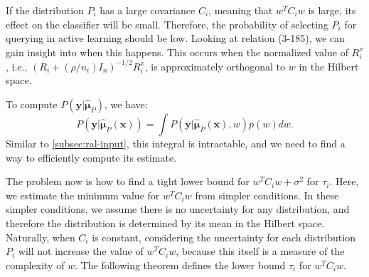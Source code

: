 	If the distribution $P_i$ has a large covariance $C_i$, meaning that $w^T C_i w$ is large, its effect on the classifier will be small. Therefore, the probability of selecting $P_i$ for querying in active learning should be low. Looking at relation (3-185), we can gain insight into when this happens. This occurs when the normalized value of $R_i^x$, i.e., $(R_i + (\rho/n_i) I_n)^{-1/2} R_i^x$, is approximately orthogonal to $w$ in the Hilbert space.
	
	To compute $P(\mathbf{y}|\hat{\boldsymbol{\mu}}_P)$, we have:
	\begin{equation}
		P(\mathbf{y}|\hat{\boldsymbol{\mu}}_P(\mathbf{x})) = \int P(\mathbf{y}|\hat{\boldsymbol{\mu}}_P(\mathbf{x}), w) p(w) dw.
	\end{equation}
	Similar to \ref{subsec:ral-input}, this integral is intractable, and we need to find a way to efficiently compute its estimate.
	
	The problem now is how to find a tight lower bound for $w^T C_i w + \sigma^2$ for $\tau_i$. Here, we estimate the minimum value for $w^T C_i w$ from simpler conditions. In these simpler conditions, we assume there is no uncertainty for any distribution, and therefore the distribution is determined by its mean in the Hilbert space. Naturally, when $C_i$ is constant, considering the uncertainty for each distribution $P_i$ will not increase the value of $w^T C_i w$, because this itself is a measure of the complexity of $w$. The following theorem defines the lower bound $\tau_i$ for $w^T C_i w$.
	
